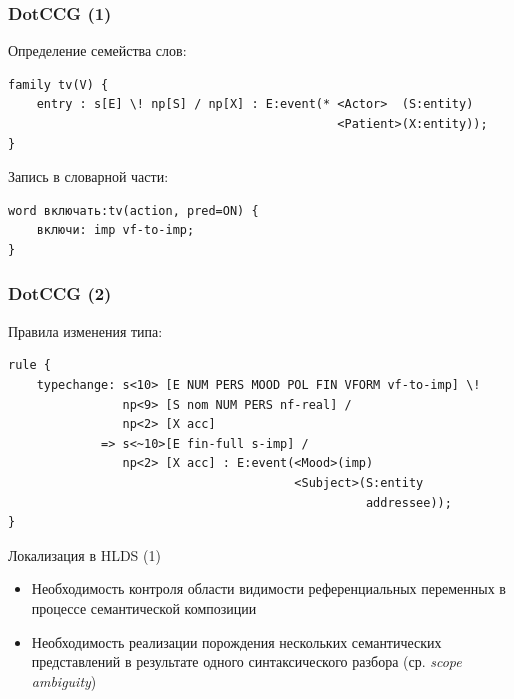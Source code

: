 \documentclass{beamer}
\begin{document}
\begin{frame}[fragile]
\frametitle{DotCCG (1)}
Определение семейства слов:
{\footnotesize \begin{verbatim}
family tv(V) {
    entry : s[E] \! np[S] / np[X] : E:event(* <Actor>  (S:entity) 
                                              <Patient>(X:entity));
}
\end{verbatim}}
\bigskip
\bigskip
Запись в словарной части:
{\footnotesize \begin{verbatim}
word включать:tv(action, pred=ON) {
    включи: imp vf-to-imp;
}
\end{verbatim}}
\end{frame}

\begin{frame}[fragile]
\frametitle{DotCCG (2)}
Правила изменения типа:
{\footnotesize \begin{verbatim}
rule {
    typechange: s<10> [E NUM PERS MOOD POL FIN VFORM vf-to-imp] \! 
                np<9> [S nom NUM PERS nf-real] / 
                np<2> [X acc]
             => s<~10>[E fin-full s-imp] / 
                np<2> [X acc] : E:event(<Mood>(imp) 
                                        <Subject>(S:entity 
                                                  addressee));
}
\end{verbatim}}
\end{frame}

\begin{frame}{Локализация в HLDS (1)}
\begin{itemize}
	\item Необходимость контроля области видимости референциальных переменных в процессе семантической композиции
	\item Необходимость реализации порождения нескольких семантических представлений в результате одного синтаксического разбора (ср. \textit{scope ambiguity})
\end{itemize}
\end{frame}
\end{document}

